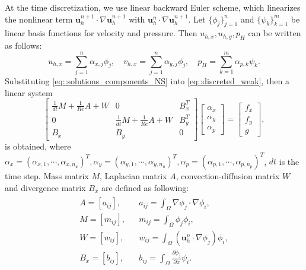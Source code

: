 \documentclass[mathpazo]{aamm}
\begin{document}
   At the time discretization, we use linear backward Euler scheme,
   which linearizes the nonlinear term $\mathbf{u}_h^{n + 1}
   \cdot \nabla \mathbf{u}_h^{n + 1}$ with $\mathbf{u}_h^{n} \cdot \nabla
   \mathbf{u}_h^{n + 1}$. Let $\{\phi_j \}_{j = 1}^n$ and $\{\psi_k\}_{k = 1}^m$ be linear basis
   functions for velocity and pressure. Then $u_{h,x}, u_{h,y}, p_H$ can be written as follows:
   \begin{equation}
     u_{h,x} = \sum_{j = 1}^n \alpha_{x,j} \phi_j, \quad v_{h,x} = \sum_{j = 1}^n \alpha_{y,j}
     \phi_j, \quad p_H = \sum_{k = 1}^m \alpha_{p,k} \psi_k. 
     \label{eq::solutions_components_NS}
   \end{equation} 
   Substituting \eqref{eq::solutions_components_NS} into \eqref{eq::discreted_weak}, 
   then a linear system
   \begin{equation}
     \left[
       \begin{array}{lll}
         \frac{1}{dt} M + \frac{1}{Re} A  + W & 0 & B_x^T \\
         0 & \frac{1}{dt} M  +\frac{1}{Re} A + W & B_y^T \\
         B_x & B_y & 0
       \end{array}
     \right]
     \left[
       \begin{array}{c}
          \alpha_x \\
          \alpha_y \\
          \alpha_p
       \end{array}
     \right] = 
     \left[
       \begin{array}{c}
         f_x \\
         f_y \\
         g
       \end{array}
     \right],
     \label{eq::linear_system}
   \end{equation}
   is obtained, where $\alpha_x = (\alpha_{x,1},\cdots,\alpha_{x,n_u})^T, \alpha_y
   = (\alpha_{y,1},\cdots,\alpha_{y,n_u})^T, \alpha_p =
   (\alpha_{p,1},\cdots, \alpha_{p,n_p})^T$, $dt$ is the time step.
   Mass matrix $M$, Laplacian matrix $A$, convection-diffusion
   matrix $W$ and divergence matrix $B_x$ are defined as following: 
   \begin{eqnarray}
     \begin{aligned}
       A = [a_{ij}], && a_{ij} = \int_\Omega \nabla \phi_j \cdot \nabla
       \phi_i, \\
       M = [m_{ij}], && m_{ij} = \int_{\Omega}\phi_j \phi_i, \\
       W = [w_{ij}], && w_{ij} = \int_{\Omega}(\mathbf{u}_h^n \cdot \nabla
       \phi_j) \phi_i, \\
       B_x = [b_{ij}], && b_{ij} = \int_{\Omega}{\frac{\partial
           \phi_j}{\partial x} \psi_i}.
     \end{aligned}  
   \end{eqnarray}
\end{document}

